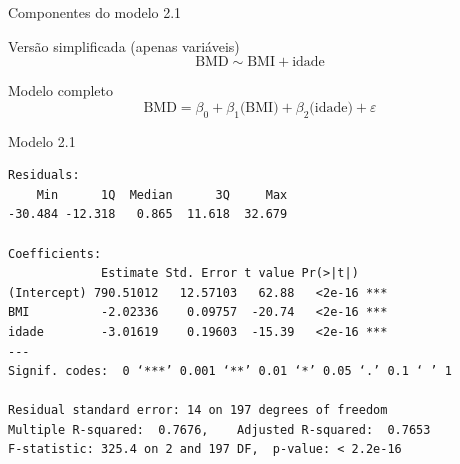 \documentclass{beamer}
\begin{document}
\begin{frame}{\scriptsize Componentes do modelo 2.1}
  \begin{block}{\footnotesize Versão simplificada (apenas variáveis)}
    \footnotesize
    \begin{displaymath}
      \text{BMD} \sim \text{BMI} + \text{idade}
    \end{displaymath}
  \end{block}
  \bigskip
  \bigskip
  \begin{block}{Modelo completo}
    \footnotesize
    \begin{displaymath}
      \text{BMD} =\beta_0 + \beta_1 \text{(BMI)} + \beta_2 \text{(idade)} +\varepsilon
    \end{displaymath}
  \end{block}
  \vfill
\end{frame}

\begin{frame}[fragile]{\scriptsize }
  \begin{center}
    \begin{exampleblock}{Modelo 2.1}
      \tiny
\begin{verbatim}
Residuals:
    Min      1Q  Median      3Q     Max 
-30.484 -12.318   0.865  11.618  32.679 

Coefficients:
             Estimate Std. Error t value Pr(>|t|)    
(Intercept) 790.51012   12.57103   62.88   <2e-16 ***
BMI          -2.02336    0.09757  -20.74   <2e-16 ***
idade        -3.01619    0.19603  -15.39   <2e-16 ***
---
Signif. codes:  0 ‘***’ 0.001 ‘**’ 0.01 ‘*’ 0.05 ‘.’ 0.1 ‘ ’ 1

Residual standard error: 14 on 197 degrees of freedom
Multiple R-squared:  0.7676,	Adjusted R-squared:  0.7653 
F-statistic: 325.4 on 2 and 197 DF,  p-value: < 2.2e-16
\end{verbatim}
    \end{exampleblock}
  \end{center}
\end{frame}
\end{document}
